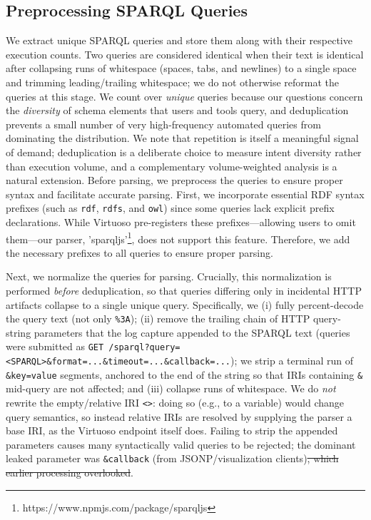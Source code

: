 \documentclass[sw]{iosart2x}
\providecommand{\DIFdel}[1]{{\protect\color{red}\sout{#1}}} %
\providecommand{\DIFdelbegin}{} %
\providecommand{\DIFdelend}{} %
\providecommand{\DIFscaledelfig}{0.5}
\newlength{\DIFdelgraphicswidth} %
\newlength{\DIFdelgraphicsheight} %
\providecommand{\DIFdelincludegraphics}[2][]{%
\sbox{\DIFdelgraphicsbox}{\DIFOincludegraphics[#1]{#2}}%
\settoboxwidth{\DIFdelgraphicswidth}{\DIFdelgraphicsbox} %
\settoboxtotalheight{\DIFdelgraphicsheight}{\DIFdelgraphicsbox} %
\scalebox{\DIFscaledelfig}{%
\parbox[b]{\DIFdelgraphicswidth}{\usebox{\DIFdelgraphicsbox}\\[-\baselineskip] \rule{\DIFdelgraphicswidth}{0em}}\llap{\resizebox{\DIFdelgraphicswidth}{\DIFdelgraphicsheight}{%
\setlength{\unitlength}{\DIFdelgraphicswidth}%
\begin{picture}(1,1)%
\thicklines\linethickness{2pt} %
{\color[rgb]{1,0,0}\put(0,0){\framebox(1,1){}}}%
{\color[rgb]{1,0,0}\put(0,0){\line( 1,1){1}}}%
{\color[rgb]{1,0,0}\put(0,1){\line(1,-1){1}}}%
\end{picture}%
}\hspace*{3pt}}} %
} %
\DeclareRobustCommand{\DIFdelbegin}{\DIFOdelbegin \let\includegraphics\DIFdelincludegraphics} %
\DeclareRobustCommand{\DIFdelend}{\DIFOaddend \let\includegraphics\DIFOincludegraphics} %
\begin{document}
\subsection{Preprocessing SPARQL Queries}

We extract unique SPARQL queries and store them along with their respective execution counts. Two queries are considered identical when their text is identical after collapsing runs of whitespace (spaces, tabs, and newlines) to a single space and trimming leading/trailing whitespace; we do not otherwise reformat the queries at this stage. We count over \emph{unique} queries because our questions concern the \emph{diversity} of schema elements that users and tools query, and deduplication prevents a small number of very high-frequency automated queries from dominating the distribution. We note that repetition is itself a meaningful signal of demand; deduplication is a deliberate choice to measure intent diversity rather than execution volume, and a complementary volume-weighted analysis is a natural extension. Before parsing, we preprocess the queries to ensure proper syntax and facilitate accurate parsing. First, we incorporate essential RDF syntax prefixes (such as \texttt{rdf}, \texttt{rdfs}, and \texttt{owl}) since some queries lack explicit prefix declarations. While Virtuoso pre-registers these prefixes—allowing users to omit them—our parser, 'sparqljs'\footnote{https://www.npmjs.com/package/sparqljs}, does not support this feature. Therefore, we add the necessary prefixes to all queries to ensure proper parsing.

Next, we normalize the queries for parsing. Crucially, this normalization is performed \emph{before} deduplication, so that queries differing only in incidental HTTP artifacts collapse to a single unique query. Specifically, we (i) fully percent-decode the query text (not only \texttt{\%3A}); (ii) remove the trailing chain of HTTP query-string parameters that the log capture appended to the SPARQL text (queries were submitted as \texttt{GET /sparql?query=<SPARQL>\&format=...\&timeout=...\&callback=...}); we strip a terminal run of \texttt{\&key=value} segments, anchored to the end of the string so that IRIs containing \texttt{\&} mid-query are not affected; and (iii) collapse runs of whitespace. We do \emph{not} rewrite the empty/relative IRI \texttt{<>}: doing so (e.g., to a variable) would change query semantics, so instead relative IRIs are resolved by supplying the parser a base IRI, as the Virtuoso endpoint itself does. Failing to strip the appended parameters causes many syntactically valid queries to be rejected; the dominant leaked parameter was \texttt{\&callback} (from JSONP/visualization clients)\DIFdelbegin \DIFdel{, which earlier processing overlooked}\DIFdelend .
\end{document}
